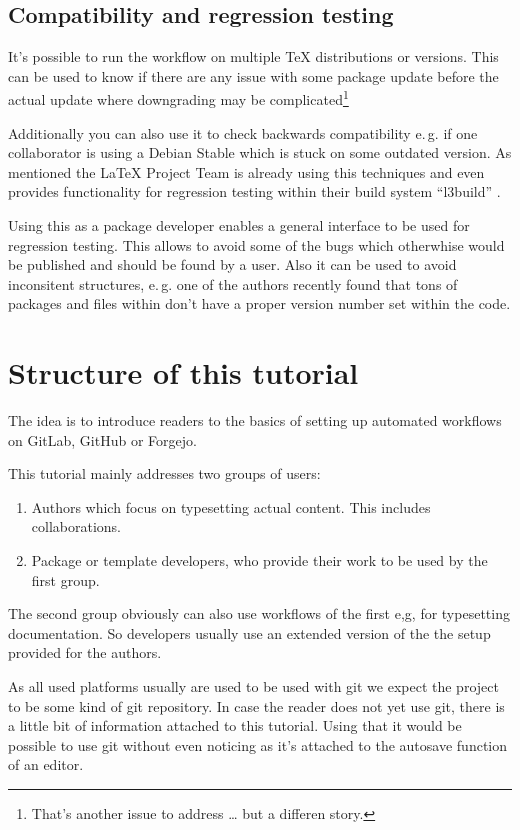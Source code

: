 \documentclass[final]{ltugboat}
\newcommand*{\TeXLive}{\acro{\TeX\,Live}}
\begin{document}
\subsection{Compatibility and regression testing}
It's possible to run the workflow on multiple TeX distributions or versions.
This can be used to know if there are any issue with some package update before the actual update where downgrading may be complicated\footnote{That's another issue to address … but a differen story.}

Additionally you can also use it to check backwards compatibility e.\,g. if one collaborator is using a Debian Stable which is stuck on some outdated version.
As mentioned the \LaTeX{} Project Team is already using this techniques and even provides functionality for regression testing within their build system \enquote{l3build} \cite{l3build}.

Using this as a package developer enables a general interface to be used for regression testing.
This allows to avoid some of the bugs which otherwhise would be published and should be found by a user.
Also it can be used to avoid inconsitent structures, e.\,g. one of the authors recently found that tons of packages and files within \TeXLive{} don't have a proper version number set within the code.

\section{Structure of this tutorial}

The idea is to introduce readers to the basics of setting up automated workflows on GitLab, GitHub or Forgejo.

This tutorial mainly addresses two groups of users:

\begin{enumerate}
\item Authors which focus on typesetting actual content. This includes collaborations.
\item Package or template developers, who provide their work to be used by the first group.
\end{enumerate}

The second group obviously can also  use workflows of the first e,g, for typesetting documentation.
So developers usually use an extended version of the the setup provided for the authors.

As all used platforms usually are used to be used with git we expect the project to be some kind of git repository.
In case the reader does not yet use git, there is a little bit of information attached to this tutorial.
Using that it would be possible to use git without even noticing as it's attached to the autosave function of an editor.
\end{document}
